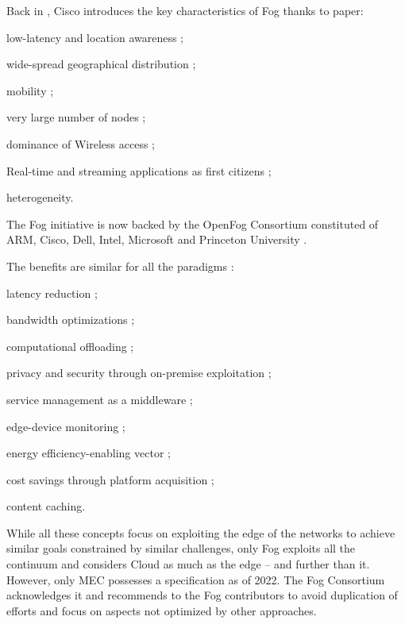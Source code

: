 \documentclass[11pt]{sdm}
\begin{document}
\begin{description}
		Back in , Cisco introduces the key characteristics of Fog thanks to  paper:
		\begin{enumerate*}[(i)]
			\item low-latency and location awareness ;
			\item wide-spread geographical distribution ;
			\item mobility ;
			\item very large number of nodes ;
			\item dominance of Wireless access ;
			\item Real-time and streaming applications as first citizens ;
			\item heterogeneity.
		\end{enumerate*}
		The Fog initiative is now backed by the OpenFog Consortium \cite{ieee_standards_association_ieee_2018} constituted of ARM, Cisco, Dell, Intel, Microsoft and Princeton University \cite{chiang_fog_2016}.
\end{description}

The benefits are similar for all the paradigms \cite{ahmed_fog_2019, ai_edge_2018}:
\begin{enumerate*}[(1)]
	\item latency reduction ;
	\item bandwidth optimizations ;
	\item computational offloading ;
	\item privacy and security through on-premise exploitation ;
	\item service management as a middleware ;
	\item edge-device monitoring ;
	\item energy efficiency-enabling vector ;
	\item cost savings through platform acquisition ;
	\item content caching.
\end{enumerate*}


While all these concepts focus on exploiting the edge of the networks to achieve similar goals constrained by similar challenges, only Fog exploits all the continuum and considers Cloud as much as the edge -- and further than it. However, only \gls{MEC} possesses a specification as of 2022. The Fog Consortium acknowledges it and recommends to the Fog contributors to avoid duplication of efforts and focus on aspects not optimized by other approaches.
\end{document}
